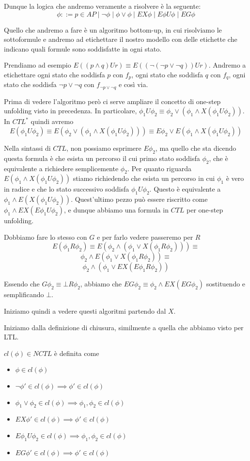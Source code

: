 Dunque la logica che andremo veramente a risolvere è la seguente:
\[\phi::= p \in AP \mid \neg \phi \mid \phi \lor \phi \mid EX \phi \mid E\phi U \phi \mid EG \phi\]

Quello che andremo a fare è un algoritmo bottom-up, in cui risolviamo le sottoformule e andremo ad etichettare il nostro modello con delle etichette che indicano quali formule sono soddisfatte in ogni stato.

Prendiamo ad esempio \(E((p\land q) U r)\equiv E((\neg(\neg p \lor \neg q))U r)\). Andremo a etichettare ogni stato che soddisfa \(p\) con \(f_p\), ogni stato che soddisfa \(q\) con \(f_q\), ogni stato che soddisfa \(\neg p \lor \neg q\) con \(f_{\neg p \lor \neg q}\) e così via.

Prima di vedere l'algoritmo però ci serve ampliare il concetto di one-step unfolding visto in precedenza.
In particolare, \(\phi_1 U \phi_2 \equiv \phi_2 \lor (\phi_1 \land X(\phi_1 U \phi_2))\). In \(CTL^*\) quindi avremo
\[E(\phi_1 U \phi_2 )\equiv E(\phi_2 \lor (\phi_1 \land X(\phi_1 U \phi_2))) \equiv E\phi_2 \lor E(\phi_1 \land X(\phi_1 U \phi_2))\]

Nella sintassi di \(CTL\)\@, non possiamo esprimere \(E \phi_2\), ma quello che sta dicendo questa formula è che esista un percorso il cui primo stato soddisfa \(\phi_2\), che è equivalente a richiedere semplicemente \(\phi_2\).
Per quanto riguarda \(E(\phi_1 \land X(\phi_1 U \phi_2))\) stiamo richiedendo che esista un percorso in cui \(\phi_1\) è vero in radice e che lo stato successivo soddisfa \(\phi_1 U \phi_2\). Questo è equivalente a \(\phi_1 \land E(X (\phi_1 U \phi_2))\).
Quest'ultimo pezzo può essere riscritto come \(\phi_1 \land EX (E \phi_1 U \phi_2)\), e dunque abbiamo una formula in \(CTL\) per one-step unfolding.

Dobbiamo fare lo stesso con \(G\) e per farlo vedere passeremo per \(R\)
\[E(\phi_1 R \phi_2) \equiv E(\phi_2 \land (\phi_1 \lor X(\phi_1 R \phi_2)))\equiv\]
\[\phi_2 \land E(\phi_1 \lor X(\phi_1 R \phi_2))\equiv\]
\[\phi_2 \land (\phi_1 \lor EX (E \phi_1 R \phi_2))\]

Essendo che \(G \phi_2 \equiv \bot R \phi_2\), abbiamo che \(EG \phi_2 \equiv \phi_2 \land EX (EG \phi_2)\) sostituendo e semplificando \(\bot\).

Iniziamo quindi a vedere questi algoritmi partendo dal \(X\).

Iniziamo dalla definizione di chiusura, similmente a quella che abbiamo visto per LTL.

\(cl(\phi) \in NCTL\) è definita come
\begin{itemize}
  \item \(\phi \in cl(\phi)\)
  \item \(\neg \phi' \in cl(\phi)\implies \phi' \in cl(\phi)\)
  \item \(\phi_1 \lor \phi_2 \in cl(\phi)\implies \phi_1, \phi_2 \in cl(\phi)\)
  \item \(EX \phi' \in cl(\phi)\implies \phi' \in cl(\phi)\)
  \item \(E\phi_1 U \phi_2 \in cl(\phi)\implies \phi_1, \phi_2 \in cl(\phi)\)
  \item \(EG \phi' \in cl(\phi)\implies \phi' \in cl(\phi)\)
\end{itemize}

